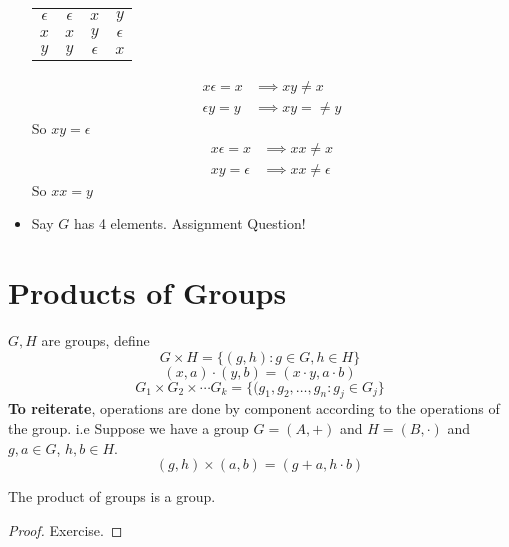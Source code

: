 \documentclass[openany]{report}
\begin{document}
\begin{itemize}
\begin{center}
\begin{tabular}{c|ccc}
             \hline
             $\epsilon$ & $\epsilon$ & $x$ & $y$\\
             $x$ & $x$ & $y$ & $\epsilon$\\
             $y$ & $y$ & $\epsilon$ & $x$\\
        \end{tabular}
    \end{center}
    \begin{align*}
        x\epsilon = x &\implies xy \neq x\\
        \epsilon y  = y &\implies xy = \neq y
    \end{align*}
    So $xy = \epsilon$
    \begin{align*}
        x \epsilon = x &\implies xx \neq x\\
        xy = \epsilon &\implies xx \neq \epsilon
    \end{align*}
    So $xx = y$
    \item Say $G$ has 4 elements. Assignment Question!
\end{itemize}
\section{Products of Groups}
$G, H$ are groups, define 
$$G \times H = \{(g,h) : g \in G, h \in H\}$$
$$(x,a) \cdot (y, b) = (x \cdot y, a \cdot b)$$
$$G_1 \times G_2 \times \cdots G_k = \{(g_1, g_2, \dots, g_n : g_j \in G_j\}$$
\textbf{To reiterate}, operations are done by component according to the operations of the group. i.e Suppose we have a group $G = (A, +)$ and $H = (B, \cdot)$ and $g,a \in G$, $h,b \in H$.
$$(g, h) \times (a,b) = (g + a, h \cdot b)$$
\begin{prop}
    The product of groups is a group.
\end{prop}
\begin{proof}
    Exercise.
\end{proof}
\end{document}
